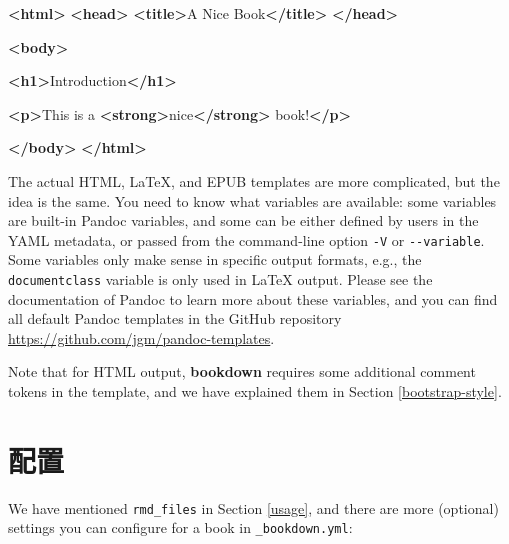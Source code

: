 \documentclass[
  12pt,
]{krantz}
\newenvironment{Shaded}{\begin{snugshade}}{\end{snugshade}}
\newcommand{\KeywordTok}[1]{\textcolor[rgb]{0.13,0.29,0.53}{\textbf{#1}}}
\newcommand{\NormalTok}[1]{#1}
\theoremstyle{definition}
\theoremstyle{definition}
\theoremstyle{definition}
\theoremstyle{definition}
\theoremstyle{remark}
\begin{document}
\begin{Shaded}
\begin{Highlighting}[]
\KeywordTok{\textless{}html\textgreater{}}
  \KeywordTok{\textless{}head\textgreater{}}
    \KeywordTok{\textless{}title\textgreater{}}\NormalTok{A Nice Book}\KeywordTok{\textless{}/title\textgreater{}}
  \KeywordTok{\textless{}/head\textgreater{}}
  
  \KeywordTok{\textless{}body\textgreater{}}
  
  \KeywordTok{\textless{}h1\textgreater{}}\NormalTok{Introduction}\KeywordTok{\textless{}/h1\textgreater{}}
  
  \KeywordTok{\textless{}p\textgreater{}}\NormalTok{This is a }\KeywordTok{\textless{}strong\textgreater{}}\NormalTok{nice}\KeywordTok{\textless{}/strong\textgreater{}}\NormalTok{ book!}\KeywordTok{\textless{}/p\textgreater{}}
  
  \KeywordTok{\textless{}/body\textgreater{}}
\KeywordTok{\textless{}/html\textgreater{}}
\end{Highlighting}
\end{Shaded}

The actual HTML, LaTeX, and EPUB templates are more complicated, but the idea is the same. You need to know what variables are available: some variables are built-in Pandoc variables, and some can be either defined by users in the YAML metadata, or passed from the command-line option \texttt{-V} or \texttt{-\/-variable}. Some variables only make sense in specific output formats, e.g., the \texttt{documentclass} variable is only used in LaTeX output. Please see the documentation of Pandoc to learn more about these variables, and you can find all default Pandoc templates in the GitHub repository \url{https://github.com/jgm/pandoc-templates}.

Note that for HTML output, \textbf{bookdown} requires some additional comment tokens in the template, and we have explained them in Section \ref{bootstrap-style}.

\hypertarget{configuration}{%
\section{配置}\label{configuration}}

We have mentioned \texttt{rmd\_files} in Section \ref{usage}, and there are more (optional) settings you can configure for a book in \texttt{\_bookdown.yml}:
\end{document}
